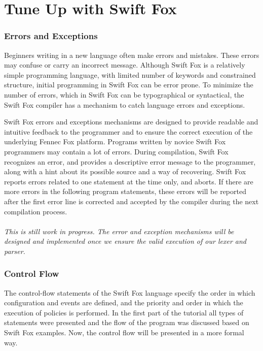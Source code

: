 \documentclass[11pt]{article}
\begin{document}
\newpage
\part{Tune Up with Swift Fox}
\newpage


\section{Errors and Exceptions}

Beginners writing in a new language often make errors and mistakes. These
errors may confuse or carry an incorrect message. Although Swift Fox is a
relatively simple programming language, with limited number of keywords and
constrained structure, initial programming in Swift Fox can be error prone.
To minimize the number of errors, which in Swift Fox can be typographical
or syntactical, the Swift Fox compiler has a mechanism to catch language
errors and exceptions.

Swift Fox errors and exceptions mechanisms are designed to provide
readable and intuitive feedback to the programmer and to ensure the correct
execution of the underlying Fennec Fox platform. Programs written by novice
Swift Fox programmers may contain a lot of errors. During compilation,
Swift Fox recognizes an error, and provides a descriptive error message to
the programmer, along with a hint about its possible source and a way of
recovering. Swift Fox reports errors related to one statement at the time
only, and aborts. If there are more errors in the following program
statements, these errors will be reported after the first error line is
corrected and accepted by the compiler during the next compilation
process.								\\
\\
\textit{This is still work in progress. The error and exception mechanisms
will be designed and implemented once we ensure the valid execution of our
lexer and parser.}
\\
 

\section{Control Flow}
\label{sec:control}

The control-flow statements of the Swift Fox language specify the order in 
which configuration and events are defined, and the priority and order in
which the execution of policies is performed. In the first part of the
tutorial all types of statements were presented and the flow of the program
was discussed based on Swift Fox examples. Now, the control flow will be
presented in a more formal way.
\end{document}
